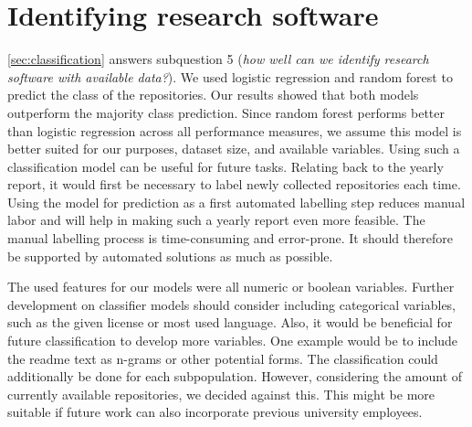 \section{Identifying research software}
\label{sec:disc:sq5}
\autoref{sec:classification} answers subquestion 5 (\textit{how well can we identify research software with available data?}). We used logistic regression and random forest to predict the class of the repositories. Our results showed that both models outperform the majority class prediction. Since random forest performs better than logistic regression across all performance measures, we assume this model is better suited for our purposes, dataset size, and available variables. Using such a classification model can be useful for future tasks. Relating back to the yearly report, it would first be necessary to label newly collected repositories each time. Using the model for prediction as a first automated labelling step reduces manual labor and will help in making such a yearly report even more feasible. The manual labelling process is time-consuming and error-prone. It should therefore be supported by automated solutions as much as possible.

The used features for our models were all numeric or boolean variables. Further development on classifier models should consider including categorical variables, such as the given license or most used language. Also, it would be beneficial for future classification to develop more variables. One example would be to include the readme text as n-grams or other potential forms. The classification could additionally be done for each subpopulation. However, considering the amount of currently available repositories, we decided against this. This might be more suitable if future work can also incorporate previous university employees.

